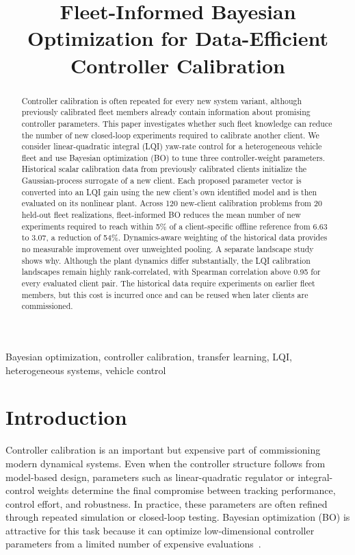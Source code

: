 \documentclass[conference]{IEEEtran}
\title{Fleet-Informed Bayesian Optimization for Data-Efficient Controller Calibration}
\author{\IEEEauthorblockN{Jakob Weber, Markus Gurtner, Adrian Trachte, Andreas Kugi}
\IEEEauthorblockA{\textit{Draft author list -- affiliations to be finalized}}}
\begin{document}
\maketitle

\begin{abstract}
Controller calibration is often repeated for every new system variant, although previously calibrated fleet members already contain information about promising controller parameters. This paper investigates whether such fleet knowledge can reduce the number of new closed-loop experiments required to calibrate another client. We consider linear-quadratic integral (LQI) yaw-rate control for a heterogeneous vehicle fleet and use Bayesian optimization (BO) to tune three controller-weight parameters. Historical scalar calibration data from previously calibrated clients initialize the Gaussian-process surrogate of a new client. Each proposed parameter vector is converted into an LQI gain using the new client's own identified model and is then evaluated on its nonlinear plant. Across 120 new-client calibration problems from 20 held-out fleet realizations, fleet-informed BO reduces the mean number of new experiments required to reach within 5\% of a client-specific offline reference from 6.63 to 3.07, a reduction of 54\%. Dynamics-aware weighting of the historical data provides no measurable improvement over unweighted pooling. A separate landscape study shows why. Although the plant dynamics differ substantially, the LQI calibration landscapes remain highly rank-correlated, with Spearman correlation above 0.95 for every evaluated client pair. The historical data require experiments on earlier fleet members, but this cost is incurred once and can be reused when later clients are commissioned.
\end{abstract}

\begin{IEEEkeywords}
Bayesian optimization, controller calibration, transfer learning, LQI, heterogeneous systems, vehicle control
\end{IEEEkeywords}

\section{Introduction}
Controller calibration is an important but expensive part of commissioning modern dynamical systems. Even when the controller structure follows from model-based design, parameters such as linear-quadratic regulator or integral-control weights determine the final compromise between tracking performance, control effort, and robustness. In practice, these parameters are often refined through repeated simulation or closed-loop testing. Bayesian optimization (BO) is attractive for this task because it can optimize low-dimensional controller parameters from a limited number of expensive evaluations~\cite{frazier2018tutorial,marco2016lqr,berkenkamp2016safe,schillinger2017safe,vonrohr2024local}.
\end{document}
